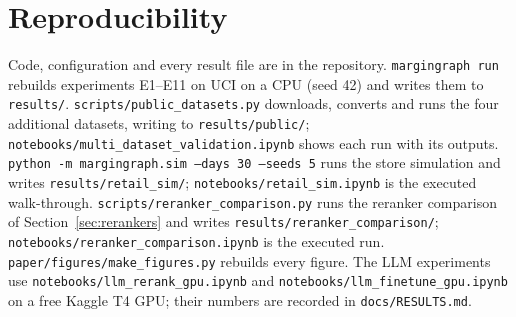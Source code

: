 \documentclass[11pt]{article}
\begin{document}
\section*{Reproducibility}
\sloppy
Code, configuration and every result file are in the repository.
\texttt{margingraph run} rebuilds experiments E1--E11 on UCI on a CPU (seed 42) and writes them to \texttt{results/}.
\texttt{scripts/public\_datasets.py} downloads, converts and runs the four additional datasets, writing to \texttt{results/public/}; \texttt{notebooks/multi\_dataset\_validation.ipynb} shows each run with its outputs.
\texttt{python -m margingraph.sim --days 30 --seeds 5} runs the store simulation and writes \texttt{results/retail\_sim/}; \texttt{notebooks/retail\_sim.ipynb} is the executed walk-through.
\texttt{scripts/reranker\_comparison.py} runs the reranker comparison of Section~\ref{sec:rerankers} and writes \texttt{results/reranker\_comparison/}; \texttt{notebooks/reranker\_comparison.ipynb} is the executed run.
\texttt{paper/figures/make\_figures.py} rebuilds every figure.
The LLM experiments use \texttt{notebooks/llm\_rerank\_gpu.ipynb} and \texttt{notebooks/llm\_finetune\_gpu.ipynb} on a free Kaggle T4 GPU; their numbers are recorded in \texttt{docs/RESULTS.md}.



\end{document}
